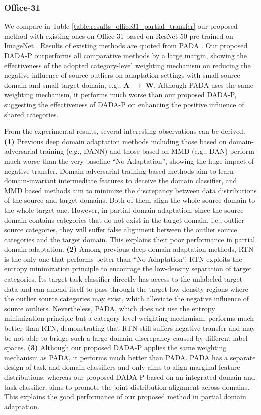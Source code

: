\documentclass[letterpaper]{article} \usepackage{aaai20}  \usepackage{times}  \usepackage{helvet} \usepackage{courier}  \usepackage[hyphens]{url}  \usepackage{graphicx} \urlstyle{rm} \def\UrlFont{\rm}  \usepackage{graphicx}  \frenchspacing  \setlength{\pdfpagewidth}{8.5in}  \setlength{\pdfpageheight}{11in}
\begin{document}
\subsubsection{Office-31}
We compare in Table \ref{table:results_office31_partial_transfer} our proposed method with existing ones on Office-31 based on ResNet-50 \cite{resnet} pre-trained on ImageNet \cite{imagenet}. Results of existing methods are quoted from PADA \cite{pada}. Our proposed DADA-P outperforms all comparative methods by a large margin, showing the effectiveness of the adopted category-level weighting mechanism on reducing the negative influence of source outliers on adaptation settings with small source domain and small target domain, e.g., \textbf{A} $\rightarrow$ \textbf{W}. Although PADA uses the same weighting mechanism, it performs much worse than our proposed DADA-P, suggesting the effectiveness of DADA-P on enhancing the positive influence of shared categories.

From the experimental results, several interesting observations can be derived. \textbf{(1)} Previous deep domain adaptation methods including those based on domain-adversarial training (e.g., DANN) and those based on MMD (e.g., DAN) perform much worse than the very baseline ``No Adaptation'', showing the huge impact of negative transfer. Domain-adversarial training based methods aim to learn domain-invariant intermediate features to deceive the domain classifier, and MMD based methods aim to minimize the discrepancy between data distributions of the source and target domains. Both of them align the whole source domain to the whole target one. However, in partial domain adaptation, since the source domain contains categories that do not exist in the target domain, i.e., outlier source categories, they will suffer false alignment between the outlier source categories and the target
domain. This explains their poor performance in partial domain adaptation. \textbf{(2)} Among previous deep domain adaptation methods, RTN is the only one that performs better than ``No Adaptation''. RTN exploits the entropy minimization principle \cite{em} to encourage the low-density separation of target categories. Its target task classifier directly has access to the unlabeled target data and can amend itself to pass through the target low-density regions where the outlier source categories may exist, which alleviate the negative influence of source outliers. Nevertheless, PADA, which does not use the entropy minimization principle but a category-level weighting mechanism, performs much better than RTN, demonstrating that RTN still suffers negative transfer and may be not able to bridge such a large domain discrepancy caused by different label spaces. \textbf{(3)} Although our proposed DADA-P applies the same weighting mechanism as PADA, it performs much better than PADA. PADA has a separate design of task and domain classifiers and only aims to align marginal feature distributions, whereas our proposed DADA-P based on an integrated domain and task classifier, aims to promote the joint distribution alignment across domains. This explains the good performance of our proposed method in partial domain adaptation.
\end{document}
